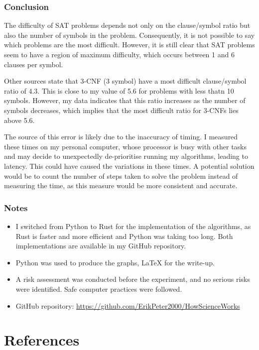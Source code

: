 \documentclass{article}
\begin{document}
    \subsubsection{Conclusion}
    
    The difficulty of SAT problems depends not only on the clause/symbol ratio but also the number of symbols in the problem. Consequently, it is not possible to say which problems are the most difficult. However, it is still clear that SAT problems seem to have a region of maximum difficulty, which occurs between 1 and 6 clauses per symbol.

    Other sources state that 3-CNF (3 symbol) have a most difficult clause/symbol ratio of 4.3.\supercite{Norvig_2021} This is close to my value of 5.6 for problems with less thatn 10 symbols. However, my data indicates that this ratio increases as the number of symbols decreases, which implies that the most difficult ratio for 3-CNFs lies above 5.6.

    The source of this error is likely due to the inaccuracy of timing. I measured these times on my personal computer, whose processor is busy with other tasks and may decide to unexpectedly de-prioritise running my algorithms, leading to latency. This could have caused the variations in these times. A potential solution would be to count the number of steps taken to solve the problem instead of measuring the time, as this measure would be more consistent and accurate.

    \subsubsection{Notes}

    \begin{itemize}
        \item I switched from Python to Rust\supercite{rust-lang} for the implementation of the algorithms, as Rust is faster and more efficient and Python was taking too long. Both implementations are available in my GitHub repository.
        \item Python was used to produce the graphs, LaTeX for the write-up.
        \item A risk assessment was conducted before the experiment, and no serious risks were identified. Safe computer practices were followed.
        \item GitHub repository: \url{https://github.com/ErikPeter2000/HowScienceWorks}
    \end{itemize}

    \section{References}
    \printbibliography[heading=none]
\end{document}
